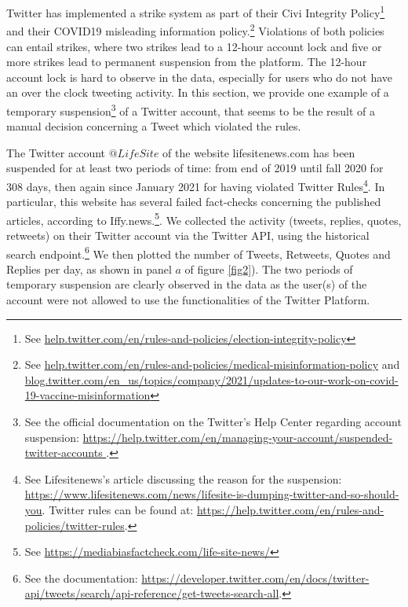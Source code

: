 \documentclass{article}
\begin{document}
Twitter has implemented a strike system as part of their Civi Integrity Policy\footnote{See \href{https://help.twitter.com/en/rules-and-policies/election-integrity-policy}{help.twitter.com/en/rules-and-policies/election-integrity-policy}} and their COVID19 misleading information policy.\footnote{See \href{https://help.twitter.com/en/rules-and-policies/medical-misinformation-policy}{help.twitter.com/en/rules-and-policies/medical-misinformation-policy} and \href{https://blog.twitter.com/en\_us/topics/company/2021/updates-to-our-work-on-covid-19-vaccine-misinformation}{blog.twitter.com/en\_us/topics/company/2021/updates-to-our-work-on-covid-19-vaccine-misinformation}} Violations of both policies can entail strikes, where two strikes lead to a 12-hour account lock and five or more strikes lead to permanent suspension from the platform. The 12-hour account lock is hard to observe in the data, especially for users who do not have an over the clock tweeting activity. In this section, we provide one example of a temporary suspension\footnote{See the official documentation on the Twitter's Help Center regarding account suspension: \href{https://help.twitter.com/en/managing-your-account/suspended-twitter-accounts}{https://help.twitter.com/en/managing-your-account/suspended-twitter-accounts }.} of a Twitter account, that seems to be the result of a manual decision concerning a Tweet which violated the rules. 

The Twitter account $@LifeSite$ of the website lifesitenews.com has been suspended for at least two periods of time: from end of 2019 until fall 2020 for 308 days, then again since January 2021 for having violated Twitter Rules\footnote{See Lifesitenews's article discussing the reason for the suspension: \href{https://www.lifesitenews.com/news/lifesite-is-dumping-twitter-and-so-should-you}{https://www.lifesitenews.com/news/lifesite-is-dumping-twitter-and-so-should-you}. Twitter rules can be found at: \href{https://help.twitter.com/en/rules-and-policies/twitter-rules}{https://help.twitter.com/en/rules-and-policies/twitter-rules}. }. In particular, this website has several failed fact-checks concerning the published articles, according to Iffy.news.\footnote{See \href{https://mediabiasfactcheck.com/life-site-news/}{https://mediabiasfactcheck.com/life-site-news/}}. We collected the activity (tweets, replies, quotes, retweets) on their Twitter account via the Twitter API, using the historical search endpoint.\footnote{See the documentation: \href{https://developer.twitter.com/en/docs/twitter-api/tweets/search/api-reference/get-tweets-search-all}{https://developer.twitter.com/en/docs/twitter-api/tweets/search/api-reference/get-tweets-search-all}.} We then plotted the number of Tweets, Retweets, Quotes and Replies per day, as shown in panel $a$ of figure \ref{fig2}). The two periods of temporary suspension are clearly observed in the data as the user(s) of the account were not allowed to use the functionalities of the Twitter Platform. 
\end{document}

